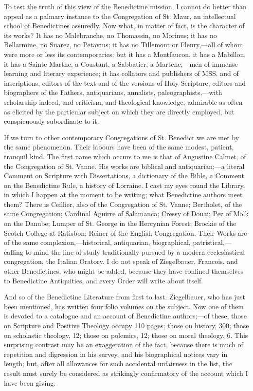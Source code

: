 To test the truth of this view of the Benedictine mission, I cannot
do better than appeal as a palmary instance to the Congregation of St.
Maur, an intellectual school of Benedictines assuredly. Now what, in
matter of fact, is the character of its works? It has no Malebranche,
no Thomassin, no Morinus; it has no Bellarmine, no Suarez, no Petavius;
it has no Tillemont or Fleury,—all of whom were more or less its
contemporaries; but it has a Montfaucon, it has a Mabillon, it has a
Sainte Marthe, a Coustant, a Sabbatier, a Martene,—men of immense
learning and literary experience; it has collators and publishers of
MSS. and of inscriptions, editors of the text and of the versions of
Holy Scripture, editors and biographers of the Fathers, antiquarians,
annalists, paleographists,—with scholarship indeed, and criticism,
and theological knowledge, admirable as often as elicited by the
particular subject on which they are directly employed, but
conspicuously subordinate to it.

If we turn to other contemporary Congregations of St. Benedict we
are met by the same phenomenon. Their labours have been of the same
modest, patient, tranquil kind. The first name which occurs to me is
that of Augustine Calmet, of the Congregation of St. Vanne. His works
are biblical and antiquarian;—a literal Comment on Scripture with
Dissertations, a dictionary of the Bible, a Comment on the Benedictine
Rule, a history of Lorraine. I cast my eyes round the Library, in
which I happen at the moment to be writing; what Benedictine authors
meet them? There is Ceillier, also of the Congregation of St. Vanne;
Bertholet, of the same Congregation; Cardinal Aguirre of Salamanca;
Cressy of Douai; Pez of Mölk on the Danube; Lumper of St. George in
the Hercynian Forest; Brockie of the Scotch College at Ratisbon;
Reiner of the English Congregation. Their Works are of the same
complexion,—historical, antiquarian, biographical, patristical,—calling
to mind the line of study traditionally pursued by a modern
ecclesiastical congregation, the Italian Oratory. I do not speak of
Ziegelbauer, Francois, and other Benedictines, who might be added,
because they have confined themselves to Benedictine Antiquities, and
every Order will write about itself.

And so of the Benedictine Literature from first to last.
Ziegelbauer, who has just been mentioned, has written four folio
volumes on the subject. Now one of them is devoted to a catalogue and
an account of Benedictine authors;—of these, those on Scripture and
Positive Theology occupy 110 pages; those on history, 300; those on
scholastic theology, 12; those on polemics, 12; those on moral
theology, 6. This surprising contrast may be an exaggeration of the
fact, because there is much of repetition and digression in his
survey, and his biographical notices vary in length; but, after all
allowances for such accidental unfairness in the list, the result must
surely be considered as strikingly confirmatory of the account which I
have been giving.

